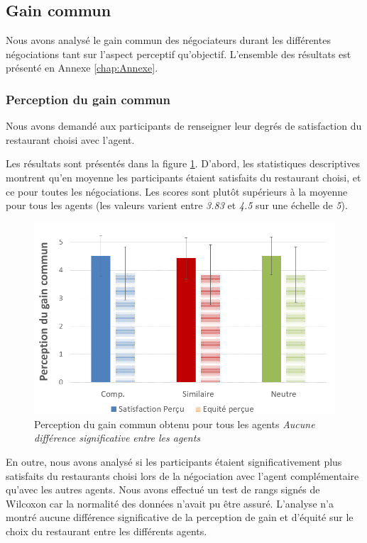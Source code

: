 	\subsection{Gain commun}
	Nous avons analysé le gain commun des négociateurs durant les différentes négociations tant sur l'aspect perceptif qu'objectif. L'ensemble des résultats est présenté en Annexe \ref{chap:Annexe}.
	
	\subsubsection{Perception du gain commun} Nous avons demandé aux participants de renseigner leur degrés de satisfaction du restaurant choisi avec l'agent.
	
	Les résultats sont présentés dans la figure \ref{fig:gainCom}. D'abord, les statistiques descriptives montrent qu'en moyenne les participants étaient satisfaits du restaurant choisi, et ce pour toutes les négociations. Les scores sont plutôt supérieurs à la moyenne pour tous les agents (les valeurs varient entre \emph{3.83} et \emph{4.5} sur une échelle de \emph{5}). 
	
	\begin{figure}
		
		\centering
		\includegraphics[width= 0.65 \linewidth,clip=false]{Figures/chap7/percpGain.PNG}
		\caption{Perception du gain commun obtenu pour tous les agents \textit{Aucune différence significative entre les agents}}
		\label{fig:gainCom}
	\end{figure}
	
	En outre, nous avons analysé si les participants étaient significativement plus satisfaits du restaurants choisi lors de la négociation avec l'agent complémentaire qu'avec les autres agents. Nous avons effectué un test de rangs signés de Wilcoxon car la normalité des données n'avait pu être assuré. L'analyse n'a montré aucune différence significative de la perception de gain et d'équité sur le choix du restaurant entre les différents agents. 
	

